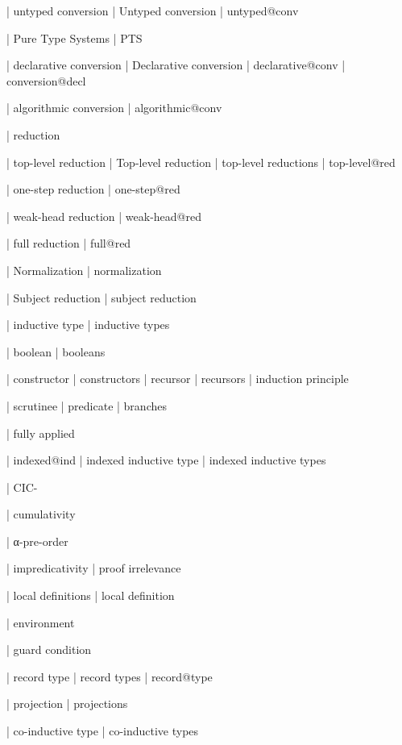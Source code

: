   | untyped conversion
  | Untyped conversion
  | untyped@conv

  | Pure Type Systems
  | PTS

  | declarative conversion
  | Declarative conversion
  | declarative@conv
  | conversion@decl

  | algorithmic conversion
  | algorithmic@conv

  | reduction

  | top-level reduction
  | Top-level reduction
  | top-level reductions
  | top-level@red

  | one-step reduction
  | one-step@red

  | weak-head reduction
  | weak-head@red

  | full reduction
  | full@red

  | Normalization
  | normalization

  | Subject reduction
  | subject reduction

  | inductive type
  | inductive types

  | boolean
  | booleans

  | constructor
  | constructors
  | recursor
  | recursors
  | induction principle

  | scrutinee
  | predicate
  | branches

  | fully applied

  | indexed@ind
  | indexed inductive type
  | indexed inductive types

  | CIC-

  | cumulativity

  | α-pre-order

  | impredicativity
  | proof irrelevance

  | local definitions
  | local definition

  | environment

  | guard condition

  | record type
  | record types
  | record@type

  | projection
  | projections

  | co-inductive type
  | co-inductive types
